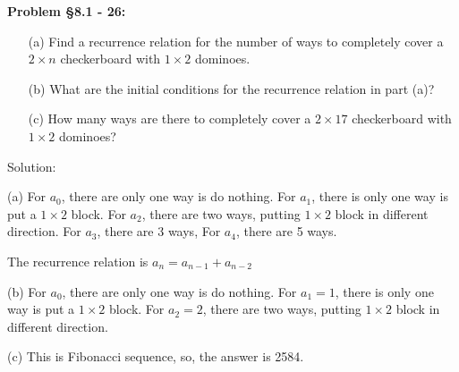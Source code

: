 \documentclass{article}
\newenvironment{problem}[1]
    {\begin{mdframed}[default]
    \textbf{Problem #1:}
    }
    {\end{mdframed}
    }
\begin{document}
\begin{problem}{\S 8.1 - 26}
\begin{itemize}
    \item[(a)] Find a recurrence relation for the number of ways to completely cover a $2 \times n$ checkerboard with $1 \times 2$ dominoes.
    \item[(b)] What are the initial conditions for the recurrence relation in part (a)?
    \item[(c)] How many ways are there to completely cover a $2 \times 17$ checkerboard with $1 \times 2$ dominoes?
\end{itemize}

Solution:

(a) For $a_0$, there are only one way is do nothing.
For $a_1$, there is only one way is put a $1\times2$ block.
For $a_2$, there are two ways, putting $1\times 2$ block in different direction.
For $a_3$, there are 3 ways,
For $a_4$, there are 5 ways.

The recurrence relation is $a_n=a_{n-1}+a_{n-2}$

(b) For $a_0$, there are only one way is do nothing.
For $a_1=1$, there is only one way is put a $1\times2$ block.
For $a_2=2$, there are two ways, putting $1\times 2$ block in different direction.

(c) This is Fibonacci sequence, so, the answer is 2584.


\end{problem}
\end{document}
